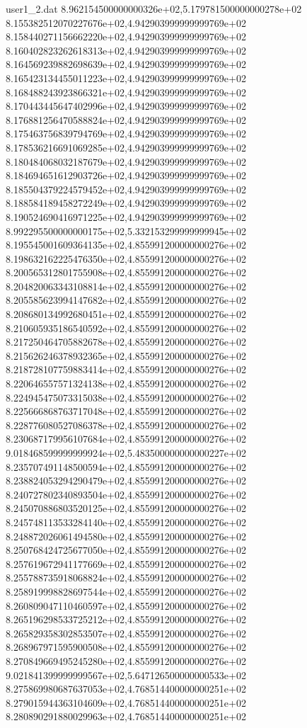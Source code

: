 \begin{filecontents}{user1_2.dat}
8.962154500000000326e+02,5.179781500000000278e+02
8.155382512070227676e+02,4.942903999999999769e+02
8.158440271156662220e+02,4.942903999999999769e+02
8.160402823262618313e+02,4.942903999999999769e+02
8.164569239882698639e+02,4.942903999999999769e+02
8.165423134455011223e+02,4.942903999999999769e+02
8.168488243923866321e+02,4.942903999999999769e+02
8.170443445647402996e+02,4.942903999999999769e+02
8.176881256470588824e+02,4.942903999999999769e+02
8.175463756839794769e+02,4.942903999999999769e+02
8.178536216691069285e+02,4.942903999999999769e+02
8.180484068032187679e+02,4.942903999999999769e+02
8.184694651612903726e+02,4.942903999999999769e+02
8.185504379224579452e+02,4.942903999999999769e+02
8.188584189458272249e+02,4.942903999999999769e+02
8.190524690416971225e+02,4.942903999999999769e+02
8.992295500000000175e+02,5.332153299999999945e+02
8.195545001609364135e+02,4.855991200000000276e+02
8.198632162225476350e+02,4.855991200000000276e+02
8.200565312801755908e+02,4.855991200000000276e+02
8.204820063343108814e+02,4.855991200000000276e+02
8.205585623994147682e+02,4.855991200000000276e+02
8.208680134992680451e+02,4.855991200000000276e+02
8.210605935186540592e+02,4.855991200000000276e+02
8.217250464705882678e+02,4.855991200000000276e+02
8.215626246378932365e+02,4.855991200000000276e+02
8.218728107759883414e+02,4.855991200000000276e+02
8.220646557571324138e+02,4.855991200000000276e+02
8.224945475073315038e+02,4.855991200000000276e+02
8.225666868763717048e+02,4.855991200000000276e+02
8.228776080527086378e+02,4.855991200000000276e+02
8.230687179956107684e+02,4.855991200000000276e+02
9.018468599999999924e+02,5.483500000000000227e+02
8.235707491148500594e+02,4.855991200000000276e+02
8.238824053294290479e+02,4.855991200000000276e+02
8.240727802340893504e+02,4.855991200000000276e+02
8.245070886803520125e+02,4.855991200000000276e+02
8.245748113533284140e+02,4.855991200000000276e+02
8.248872026061494580e+02,4.855991200000000276e+02
8.250768424725677050e+02,4.855991200000000276e+02
8.257619672941177669e+02,4.855991200000000276e+02
8.255788735918068824e+02,4.855991200000000276e+02
8.258919998828697544e+02,4.855991200000000276e+02
8.260809047110460597e+02,4.855991200000000276e+02
8.265196298533725212e+02,4.855991200000000276e+02
8.265829358302853507e+02,4.855991200000000276e+02
8.268967971595900508e+02,4.855991200000000276e+02
8.270849669495245280e+02,4.855991200000000276e+02
9.021841399999999567e+02,5.647126500000000533e+02
8.275869980687637053e+02,4.768514400000000251e+02
8.279015944363104609e+02,4.768514400000000251e+02
8.280890291880029963e+02,4.768514400000000251e+02

\end{filecontents}
